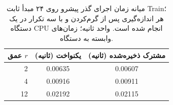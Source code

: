 \begin{table}[htbp]
\centering\small
\caption{میانه زمان اجرای گذر پیشرو روی ۲۴ مبدأ ثابت Train؛ هر اندازه‌گیری پس از گرم‌کردن و با سه تکرار در یک دستگاه CPU انجام شده است. واحد ثانیه؛ زمان‌های وابسته به دستگاه.}
\label{tab:ch4-matrix-runtime}
\begin{tabular}{rcc}\hline
عمق $r$ & یکنواخت (ثانیه) & مشترک ذخیره‌شده (ثانیه)\\\hline
2 & 0.00635 & 0.00607\\
4 & 0.00916 & 0.00911\\
12 & 0.02192 & 0.02115\\
\hline
\end{tabular}
\end{table}
